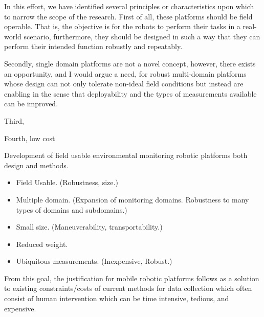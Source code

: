 
	In this effort, we have identified several principles or characteristics upon which to narrow the scope of the research. First of all, these platforms should be field operable. That is, the objective is for the robots to perform their tasks in a real-world scenario, furthermore, they should be designed in such a way that they can perform their intended function robustly and repeatably. 

	Secondly, single domain platforms are not a novel concept, however, there exists an opportunity, and I would argue a need, for robust multi-domain platforms whose design can not only tolerate non-ideal field conditions but instead are enabling in the sense that deployability and the types of measurements available can be improved. 

	Third, 

	Fourth, low cost




	Development of field usable environmental monitoring robotic platforms both design and methods. 

	\begin{itemize}
		\item Field Usable. (Robustness, size.)
		\item Multiple domain. (Expansion of monitoring domains. Robustness to many types of domains and subdomains.) 
		\item Small size. (Maneuverability, transportability.)
		\item Reduced weight.
		\item Ubiquitous measurements. (Inexpensive, Robust.)
	\end{itemize}



	From this goal, the justification for mobile robotic platforms follows as a solution to existing constraints/costs of current methods for data collection which often consist of human intervention which can be time intensive, tedious, and expensive. 

